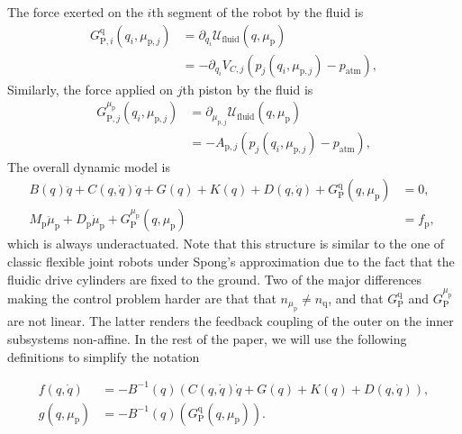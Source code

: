 The force exerted on the $i$th segment of the robot by the fluid is 
%
\begin{equation}\label{eq:GPq}
\begin{split}
    G_{\mathrm{P},i}^{\mathrm{q}}(q_i,\mu_{\mathrm{p},j}) &= \partial_{q_i} \mathcal{U}_\mathrm{fluid}(q,\mu_\mathrm{p}) \\
    &= -\partial_{q_i} V_{C,j} \left ( p_{j}(q_i, \mu_{\mathrm{p},j}) - p_\mathrm{atm} \right ), 
\end{split}
\end{equation}
Similarly, the force applied on $j$th piston by the fluid is
%
\begin{equation}\label{eq:GPmu}
\begin{split}
    G_{\mathrm{P},j}^{\mu_\mathrm{p}}(q_i,\mu_{\mathrm{p},j}) &= \partial_{\mu_{\mathrm{p},j}} \mathcal{U}_\mathrm{fluid}(q,\mu_\mathrm{p}) \\
    &= - A_{\mathrm{p},j} \left ( p_{j}(q_i, \mu_{\mathrm{p},j}) - p_\mathrm{atm} \right ), 
\end{split}
\end{equation}
%
The overall dynamic model is
%
\begin{equation}\label{eq:complete_dyn} %
\begin{split}
	B(q)\ddot{q} \!+\! C(q,\dot{q})\dot{q} \!+\! G(q) \!+\! K(q) \!+\! D(q,\dot{q}) \!+\! G_{\mathrm{P}}^{\mathrm{q}}(q,\mu_\mathrm{p}) &= 0, \\
	M_\mathrm{p} \ddot{\mu}_\mathrm{p} + D_\mathrm{p} \dot{\mu}_\mathrm{p} + G_{\mathrm{P}}^{\mu_\mathrm{p}}(q,\mu_\mathrm{p}) &= f_\mathrm{p}, \; 
\end{split}
\end{equation}
which is always underactuated.
%
Note that this structure is similar to the one of classic flexible joint robots under Spong's approximation \cite{della2021flexible} due to the fact that the fluidic drive cylinders are fixed to the ground. Two of the major differences making the control problem harder are that that $n_{\mu_\mathrm{p}} \neq n_{\mathrm{q}}$, and that $G_{\mathrm{P}}^{\mathrm{q}}$ and $G_{\mathrm{P}}^{\mu_\mathrm{p}}$ are not linear.
The latter renders the feedback coupling of the outer on the inner subsystems non-affine.
%
In the rest of the paper, we will use the following definitions to simplify the notation
%
\begin{small}
\begin{equation}\label{eq:gf}
\begin{split}
	f(q,\dot{q}) &= - B^{-1}(q)\left(C(q,\dot{q})\dot{q} + G(q) + K(q) + D(q, \dot{q}) \right), \\
	g(q,\mu_\mathrm{p}) &= - B^{-1}(q) \left ( G_{\mathrm{P}}^{\mathrm{q}}(q,\mu_\mathrm{p}) \right ).
\end{split}
\end{equation}
\end{small}